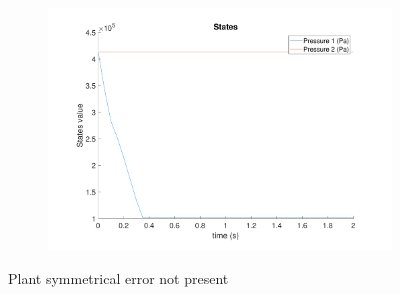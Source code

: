 \documentclass[11pt,a4paper]{article}
\begin{document}
\begin{figure}[!hbt]
\begin{subfigure}[t]{0.45\textwidth}
    \caption{}
    \end{subfigure}
    ~
    \begin{subfigure}[t]{0.45\textwidth}
    \centering
    \includegraphics[width=\textwidth]{figure4.pdf}
    \caption{}
    \end{subfigure}
    \caption{Plant symmetrical error not present}
    \label{fig:simulated_symmectrical_error_2}
\end{figure}
\end{document}
